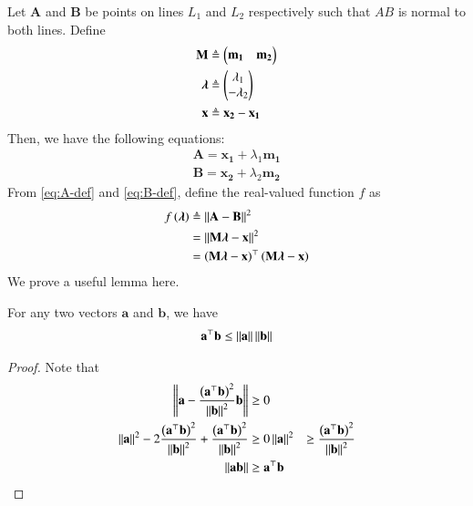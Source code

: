 \documentclass[journal,12pt,twocolumn]{IEEEtran}
\renewcommand{\vec}[1]{\boldsymbol{\mathbf{#1}}}
\begin{document}
\begin{enumerate}
    \solution Let $\vec{A}$ and $\vec{B}$ be points on lines $L_1$ and $L_2$
    respectively such that $AB$ is normal to both lines. Define
    \begin{align}
        \vec{M} &\triangleq \myvec{\vec{m_1} & \vec{m_2}} \label{eq:M-def} \\
        \vec{\lambda} &\triangleq \myvec{\lambda_1\\-\lambda_2} \label{eq:lambda-def} \\
        \vec{x} &\triangleq \vec{x_2} - \vec{x_1} \label{eq:x-def}
    \end{align}
    Then, we have the following equations:
    \begin{align}
        \vec{A} = \vec{x_1} + \lambda_1\vec{m_1} \label{eq:A-def} \\
        \vec{B} = \vec{x_2} + \lambda_2\vec{m_2} \label{eq:B-def}
    \end{align}
    From \eqref{eq:A-def} and \eqref{eq:B-def}, define the real-valued function
    $f$ as
    \begin{align}
        f\brak{\vec{\lambda}} &\triangleq \norm{\vec{A}-\vec{B}}^2 \\
                              &= \norm{\vec{M}\vec{\lambda}-\vec{x}}^2 \\
                              &= \brak{\vec{M\lambda}-\vec{x}}^\top\brak{\vec{M\lambda}-\vec{x}}
        \label{eq:f-def}
    \end{align}
    We prove a useful lemma here.
    \begin{lemma}
        For any two vectors $\vec{a}$ and $\vec{b}$, we have
        \begin{align}
            \vec{a}^\top\vec{b} \le \norm{\vec{a}}\norm{\vec{b}}
            \label{eq:dot-mag}
        \end{align}
        \label{lem:dot-mag}
    \end{lemma}
    \begin{proof}
        Note that
        \begin{align}
            \norm{\vec{a}-\frac{\brak{\vec{a}^\top\vec{b}}^2}{\norm{\vec{b}}^2}\vec{b}} &\ge 0 \\
            \norm{\vec{a}}^2 - 2\frac{\brak{\vec{a}^\top\vec{b}}^2}{\norm{\vec{b}}^2} + \frac{\brak{\vec{a}^\top\vec{b}}^2}{\norm{\vec{b}}^2} &\ge 0
            \norm{\vec{a}}^2 &\ge \frac{\brak{\vec{a}^\top\vec{b}}^2}{\norm{\vec{b}}^2} \\
            \norm{\vec{a}\vec{b}} &\ge \vec{a}^\top\vec{b}
            \label{eq:proof-dot-mag}
        \end{align}

\end{proof}
\end{enumerate}
\end{document}
